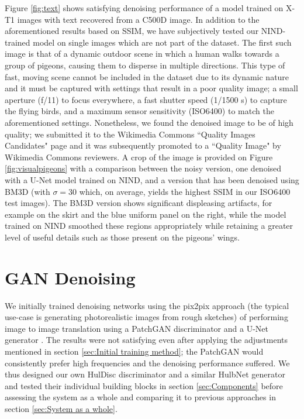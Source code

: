 Figure \ref{fig:text} shows satisfying denoising performance of a model trained on \ac{X-T1} images with text recovered from a \ac{C500D} image. In addition to the aforementioned results based on \ac{SSIM}, we have subjectively tested our \ac{NIND}-trained model on single images which are not part of the dataset. The first such image is that of a dynamic outdoor scene in which a human walks towards a group of pigeons, causing them to disperse in multiple directions. This type of fast, moving scene cannot be included in the dataset due to its dynamic nature and it must be captured with settings that result in a poor quality image; a small aperture (f/11) to focus everywhere, a fast shutter speed (1/1500 s) to capture the flying birds, and a maximum sensor sensitivity (ISO6400) to match the aforementioned settings. Nonetheless, we found the denoised image to be of high quality; we submitted it to the Wikimedia Commons ``Quality Images Candidates" page \cite{qic} and it was subsequently promoted to a ``Quality Image" by Wikimedia Commons reviewers. A crop of the image is provided on Figure \ref{fig:visualpigeons} with a comparison between the noisy version, one denoised with a U-Net model trained on \ac{NIND}, and a version that has been denoised using \ac{BM3D} (with $\sigma=30$ which, on average, yields the highest \ac{SSIM} in our ISO6400 test images). The BM3D version shows significant displeasing artifacts, for example on the skirt and the blue uniform panel on the right, while the model trained on \ac{NIND} smoothed these regions appropriately while retaining a greater level of useful details such as those present on the pigeons' wings.


\section{GAN Denoising}\label{sec:GAN Denoising}

We initially trained denoising networks using the pix2pix approach (the typical use-case is generating photorealistic images from rough sketches) of performing image to image translation using a PatchGAN discriminator and a U-Net generator \cite{pix2pix}. The results were not satisfying even after applying the adjustments mentioned in section \ref{sec:Initial training method}; the PatchGAN would consistently prefer high frequencies and the denoising performance suffered. We thus designed our own HulDisc discriminator and a similar HulbNet generator and tested their individual building blocks in section \ref{sec:Components} before assessing the system as a whole and comparing it to previous approaches in section \ref{sec:System as a whole}.

